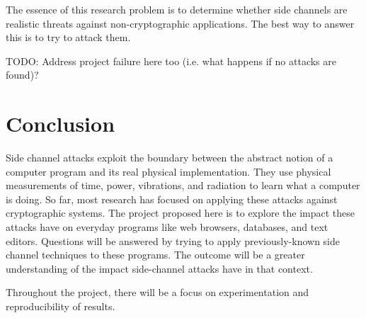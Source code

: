 \documentclass{acm_proc_article-sp}
\begin{document}
% 
% 

The essence of this research problem is to determine whether side channels are
realistic threats against non-cryptographic applications. The best way to answer
this is to try to attack them.

TODO: Address project failure here too (i.e. what happens if no attacks are
found)?

\section{Conclusion}

Side channel attacks exploit the boundary between the abstract notion of
a computer program and its real physical implementation. They use physical
measurements of time, power, vibrations, and radiation to learn what a computer
is doing. So far, most research has focused on applying these attacks against
cryptographic systems. The project proposed here is to explore the impact these
attacks have on everyday programs like web browsers, databases, and text
editors. Questions will be answered by trying to apply previously-known side
channel techniques to these programs. The outcome will be a greater
understanding of the impact side-channel attacks have in that context.

Throughout the project, there will be a focus on experimentation and
reproducibility of results.
\end{document}
